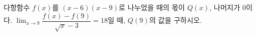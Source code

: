 다항함수 $f(x)$를 $(x-6)(x-9)$로 나누었을 때의 몫이 $Q(x)$, 나머지가 $0$이다. $\displaystyle\lim_{x\to 9}\dfrac{f(x)-f(9)}{\sqrt{x}-3}=18$일 때, $Q(9)$의 값을 구하시오.
